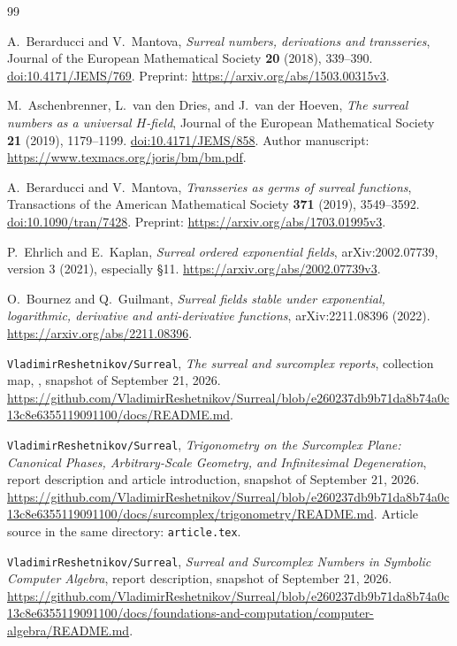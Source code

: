 \documentclass[11pt,letterpaper]{article}
\numberwithin{equation}{section}
\theoremstyle{definition}
\theoremstyle{remark}
\newcommand{\Repo}{\texttt{VladimirReshetnikov/Surreal}}
\begin{document}
\begin{thebibliography}{99}

A.~Berarducci and V.~Mantova,
\emph{Surreal numbers, derivations and transseries},
Journal of the European Mathematical Society \textbf{20} (2018), 339--390.
\href{https://doi.org/10.4171/JEMS/769}{doi:10.4171/JEMS/769}.
Preprint: \url{https://arxiv.org/abs/1503.00315v3}.

M.~Aschenbrenner, L.~van den Dries, and J.~van der Hoeven,
\emph{The surreal numbers as a universal $H$-field},
Journal of the European Mathematical Society \textbf{21} (2019), 1179--1199.
\href{https://doi.org/10.4171/JEMS/858}{doi:10.4171/JEMS/858}.
Author manuscript: \url{https://www.texmacs.org/joris/bm/bm.pdf}.

A.~Berarducci and V.~Mantova,
\emph{Transseries as germs of surreal functions},
Transactions of the American Mathematical Society \textbf{371} (2019), 3549--3592.
\href{https://doi.org/10.1090/tran/7428}{doi:10.1090/tran/7428}.
Preprint: \url{https://arxiv.org/abs/1703.01995v3}.

P.~Ehrlich and E.~Kaplan,
\emph{Surreal ordered exponential fields},
arXiv:2002.07739, version 3 (2021), especially \S11.
\url{https://arxiv.org/abs/2002.07739v3}.

O.~Bournez and Q.~Guilmant,
\emph{Surreal fields stable under exponential, logarithmic, derivative and anti-derivative functions},
arXiv:2211.08396 (2022).
\url{https://arxiv.org/abs/2211.08396}.

\Repo,
\emph{The surreal and surcomplex reports}, collection map,
, snapshot of September 21, 2026.
\url{https://github.com/VladimirReshetnikov/Surreal/blob/e260237db9b71da8b74a0c13c8e6355119091100/docs/README.md}.

\Repo,
\emph{Trigonometry on the Surcomplex Plane: Canonical Phases, Arbitrary-Scale Geometry, and Infinitesimal Degeneration},
report description and article introduction, snapshot of September 21, 2026.
\url{https://github.com/VladimirReshetnikov/Surreal/blob/e260237db9b71da8b74a0c13c8e6355119091100/docs/surcomplex/trigonometry/README.md}.
Article source in the same directory: \texttt{article.tex}.

\Repo,
\emph{Surreal and Surcomplex Numbers in Symbolic Computer Algebra},
report description, snapshot of September 21, 2026.
\url{https://github.com/VladimirReshetnikov/Surreal/blob/e260237db9b71da8b74a0c13c8e6355119091100/docs/foundations-and-computation/computer-algebra/README.md}.

\end{thebibliography}
\end{document}
